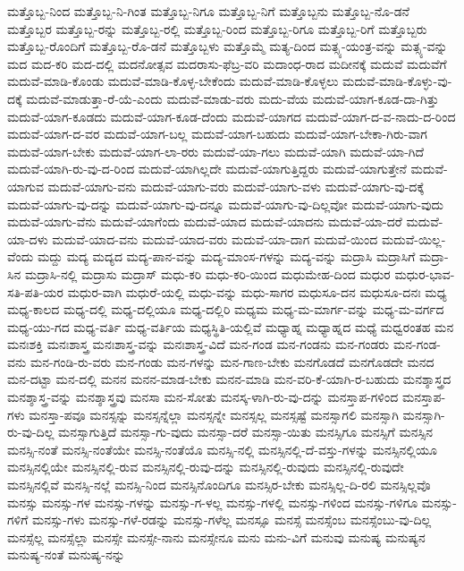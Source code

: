 {ಮತ್ತೊಬ್ಬ-ನಿಂದ
ಮತ್ತೊಬ್ಬ-ನಿ-ಗಿಂತ
ಮತ್ತೊಬ್ಬ-ನಿಗೂ
ಮತ್ತೊಬ್ಬ-ನಿಗೆ
ಮತ್ತೊಬ್ಬನು
ಮತ್ತೊಬ್ಬ-ನೊ-ಡನೆ
ಮತ್ತೊಬ್ಬರ
ಮತ್ತೊಬ್ಬ-ರನ್ನು
ಮತ್ತೊಬ್ಬ-ರಲ್ಲಿ
ಮತ್ತೊಬ್ಬ-ರಿಂದ
ಮತ್ತೊಬ್ಬ-ರಿಗೂ
ಮತ್ತೊಬ್ಬ-ರಿಗೆ
ಮತ್ತೊಬ್ಬರು
ಮತ್ತೊಬ್ಬ-ರೊಂದಿಗೆ
ಮತ್ತೊಬ್ಬ-ರೊ-ಡನೆ
ಮತ್ತೊಬ್ಬಳು
ಮತ್ತೊಮ್ಮೆ
ಮತ್ಯ-ದಿಂದ
ಮತ್ಸ್ಯ-ಯಂತ್ರ-ವನ್ನು
ಮತ್ಸ್ಯ-ವನ್ನು
ಮದ
ಮದ-ಕರಿ
ಮದ-ದಲ್ಲಿ
ಮದನೋತ್ಸವ
ಮದರಾಸು-ಫೆಬ್ರ-ವರಿ
ಮದಾಂಧ-ರಾದ
ಮದೀನಕ್ಕೆ
ಮದುವೆ
ಮದುವೆಗೆ
ಮದುವೆ-ಮಾಡಿ-ಕೊಂಡು
ಮದುವೆ-ಮಾಡಿ-ಕೊಳ್ಳ-ಬೇಕೆಂದು
ಮದುವೆ-ಮಾಡಿ-ಕೊಳ್ಳಲು
ಮದುವೆ-ಮಾಡಿ-ಕೊಳ್ಳು-ವು-ದಕ್ಕೆ
ಮದುವೆ-ಮಾಡುತ್ತಾ-ರೆ-ಯೆ-ಎಂದು
ಮದುವೆ-ಮಾಡು-ವರು
ಮದು-ವೆಯ
ಮದುವೆ-ಯಾಗ-ಕೂಡ-ದಾ-ಗಿತ್ತು
ಮದುವೆ-ಯಾಗ-ಕೂಡದು
ಮದುವೆ-ಯಾಗ-ಕೂಡ-ದೆಂದು
ಮದುವೆ-ಯಾಗದ
ಮದುವೆ-ಯಾಗ-ದ-ವ-ನಾದು-ದ-ರಿಂದ
ಮದುವೆ-ಯಾಗ-ದ-ವರ
ಮದುವೆ-ಯಾಗ-ಬಲ್ಲ
ಮದುವೆ-ಯಾಗ-ಬಹುದು
ಮದುವೆ-ಯಾಗ-ಬೇಕಾ-ಗಿರು-ವಾಗ
ಮದುವೆ-ಯಾಗ-ಬೇಕು
ಮದುವೆ-ಯಾಗ-ಲಾ-ರರು
ಮದುವೆ-ಯಾ-ಗಲು
ಮದುವೆ-ಯಾಗಿ
ಮದುವೆ-ಯಾ-ಗಿದೆ
ಮದುವೆ-ಯಾಗಿ-ರು-ವು-ದ-ರಿಂದ
ಮದುವೆ-ಯಾಗಿಲ್ಲದೇ
ಮದುವೆ-ಯಾಗುತ್ತಿದ್ದರು
ಮದುವೆ-ಯಾಗುತ್ತೇನೆ
ಮದುವೆ-ಯಾಗುವ
ಮದುವೆ-ಯಾಗು-ವನು
ಮದುವೆ-ಯಾಗು-ವರು
ಮದುವೆ-ಯಾಗು-ವಳು
ಮದುವೆ-ಯಾಗು-ವು-ದಕ್ಕೆ
ಮದುವೆ-ಯಾಗು-ವು-ದನ್ನು
ಮದುವೆ-ಯಾಗು-ವು-ದನ್ನೂ
ಮದುವೆ-ಯಾಗು-ವು-ದಿಲ್ಲವೋ
ಮದುವೆ-ಯಾಗು-ವುದು
ಮದುವೆ-ಯಾಗು-ವೆನು
ಮದುವೆ-ಯಾಗೆಂದು
ಮದುವೆ-ಯಾದ
ಮದುವೆ-ಯಾದನು
ಮದುವೆ-ಯಾ-ದರೆ
ಮದುವೆ-ಯಾ-ದಳು
ಮದುವೆ-ಯಾದ-ವನು
ಮದುವೆ-ಯಾದ-ವರು
ಮದುವೆ-ಯಾ-ದಾಗ
ಮದುವೆ-ಯಿಂದ
ಮದುವೆ-ಯಿಲ್ಲ-ವೆಂದು
ಮದ್ದು
ಮದ್ಯ
ಮದ್ಯದ
ಮದ್ಯ-ಪಾನ-ವನ್ನು
ಮದ್ಯ-ಮಾಂಸ-ಗಳನ್ನು
ಮದ್ಯ-ವನ್ನು
ಮದ್ರಾಸಿ
ಮದ್ರಾಸಿಗೆ
ಮದ್ರಾ-ಸಿನ
ಮದ್ರಾಸಿ-ನಲ್ಲಿ
ಮದ್ರಾಸು
ಮದ್ರಾಸ್
ಮಧು-ಕರಿ
ಮಧು-ಕರಿ-ಯಿಂದ
ಮಧುಮೇಹ-ದಿಂದ
ಮಧುರ
ಮಧುರ-ಭಾವ-ಸತಿ-ಪತಿ-ಯರ
ಮಧುರ-ವಾಗಿ
ಮಧುರೆ-ಯಲ್ಲಿ
ಮಧು-ವನ್ನು
ಮಧು-ಸಾಗರ
ಮಧುಸೂ-ದನ
ಮಧುಸೂ-ದನಃ
ಮಧ್ಯ
ಮಧ್ಯ-ಕಾಲದ
ಮಧ್ಯ-ದಲ್ಲಿ
ಮಧ್ಯ-ದಲ್ಲಿಯೂ
ಮಧ್ಯ-ದಲ್ಲಿರಿ
ಮಧ್ಯಮ
ಮಧ್ಯ-ಮ-ಮಾರ್ಗ-ವನ್ನು
ಮಧ್ಯ-ಮ-ವರ್ಗದ
ಮಧ್ಯ-ಯು-ಗದ
ಮಧ್ಯ-ವರ್ತಿ
ಮಧ್ಯ-ವರ್ತಿಯ
ಮಧ್ಯಸ್ಥಿತಿ-ಯಲ್ಲಿವೆ
ಮಧ್ಯಾಹ್ನ
ಮಧ್ಯಾಹ್ನದ
ಮಧ್ಯೆ
ಮಧ್ವರಂತಹ
ಮನ
ಮನಃಶಕ್ತಿ
ಮನಃಶಾಸ್ತ್ರ
ಮನಃಶಾಸ್ತ್ರ-ವನ್ನು
ಮನಃಶಾಸ್ತ್ರ-ವಿದೆ
ಮನ-ಗಂಡ
ಮನ-ಗಂಡನು
ಮನ-ಗಂಡರು
ಮನ-ಗಂಡ-ವನು
ಮನ-ಗಂಡಿ-ರು-ವರು
ಮನ-ಗಂಡು
ಮನ-ಗಳನ್ನು
ಮನ-ಗಾಣ-ಬೇಕು
ಮನಗೊಡದೆ
ಮನಗೊಡದೇ
ಮನದ
ಮನ-ದಟ್ಟಾ
ಮನ-ದಲ್ಲಿ
ಮನನ
ಮನನ-ಮಾಡ-ಬೇಕು
ಮನನ-ಮಾಡಿ
ಮನ-ವರಿ-ಕೆ-ಯಾಗಿ-ರ-ಬಹುದು
ಮನಶ್ಶಾಸ್ತ್ರದ
ಮನಶ್ಶಾಸ್ತ್ರ-ವನ್ನು
ಮನಶ್ಶಾಸ್ತ್ರವು
ಮನಸಾ
ಮನ-ಸೋತು
ಮನಸ್ಕ-ಳಾಗಿ-ರು-ವು-ದನ್ನು
ಮನಸ್ತಾಪ-ಗಳಿಂದ
ಮನಸ್ತಾಪ-ಗಳು
ಮನಸ್ತಾ-ಪವೂ
ಮನಸ್ಸನ್ನು
ಮನಸ್ಸನ್ನೆಲ್ಲಾ
ಮನಸ್ಸನ್ನೇ
ಮನಸ್ಸಲ್ಲ
ಮನಸ್ಸಷ್ಟೆ
ಮನಸ್ಸಾಗಲಿ
ಮನಸ್ಸಾಗಿ
ಮನಸ್ಸಾಗಿ-ರು-ವು-ದಿಲ್ಲ
ಮನಸ್ಸಾಗುತ್ತಿದೆ
ಮನಸ್ಸಾ-ಗು-ವುದು
ಮನಸ್ಸಾ-ದರೆ
ಮನಸ್ಸಾ-ಯಿತು
ಮನಸ್ಸಿಗೂ
ಮನಸ್ಸಿಗೆ
ಮನಸ್ಸಿನ
ಮನಸ್ಸಿ-ನಂತೆ
ಮನಸ್ಸಿ-ನಂತೆಯೇ
ಮನಸ್ಸಿ-ನಂತೆಯೊ
ಮನಸ್ಸಿ-ನಲ್ಲಿ
ಮನಸ್ಸಿನಲ್ಲಿ-ದೆ-ವಸ್ತು-ಗಳನ್ನು
ಮನಸ್ಸಿನಲ್ಲಿಯೂ
ಮನಸ್ಸಿನಲ್ಲಿಯೇ
ಮನಸ್ಸಿನಲ್ಲಿ-ರುವ
ಮನಸ್ಸಿನಲ್ಲಿ-ರುವು-ದನ್ನು
ಮನಸ್ಸಿನಲ್ಲಿ-ರುವುದು
ಮನಸ್ಸಿನಲ್ಲಿ-ರುವುದೇ
ಮನಸ್ಸಿನಲ್ಲಿವೆ
ಮನಸ್ಸಿ-ನಲ್ಲೆ
ಮನಸ್ಸಿ-ನಿಂದ
ಮನಸ್ಸಿನೊಂದಿಗೂ
ಮನಸ್ಸಿರ-ಬೇಕು
ಮನಸ್ಸಿಲ್ಲ-ದಿ-ರಲಿ
ಮನಸ್ಸಿಲ್ಲವೊ
ಮನಸ್ಸು
ಮನಸ್ಸು-ಗಳ
ಮನಸ್ಸು-ಗಳನ್ನು
ಮನಸ್ಸು-ಗ-ಳಲ್ಲ
ಮನಸ್ಸು-ಗಳಲ್ಲಿ
ಮನಸ್ಸು-ಗಳಿಂದ
ಮನಸ್ಸು-ಗಳಿಗೂ
ಮನಸ್ಸು-ಗಳಿಗೆ
ಮನಸ್ಸು-ಗಳು
ಮನಸ್ಸು-ಗಳೆ-ರಡನ್ನು
ಮನಸ್ಸು-ಗಳೆಲ್ಲ
ಮನಸ್ಸೂ
ಮನಸ್ಸೆ
ಮನಸ್ಸೆಂಬ
ಮನಸ್ಸೆಂಬು-ವು-ದಿಲ್ಲ
ಮನಸ್ಸೆಲ್ಲ
ಮನಸ್ಸೆಲ್ಲಾ
ಮನಸ್ಸೇ
ಮನಸ್ಸೇ-ನಾನು
ಮನಸ್ಸೇನೂ
ಮನು
ಮನು-ವಿಗೆ
ಮನುವು
ಮನುಷ್ಯ
ಮನುಷ್ಯನ
ಮನುಷ್ಯ-ನಂತೆ
ಮನುಷ್ಯ-ನನ್ನು
}
